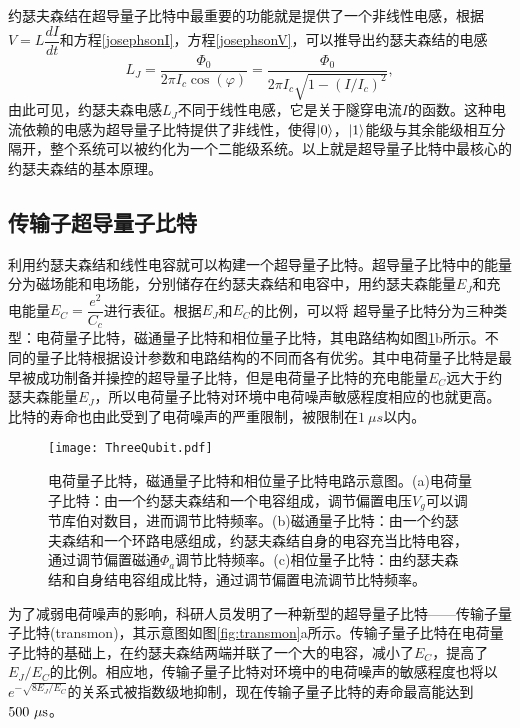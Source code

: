 约瑟夫森结在超导量子比特中最重要的功能就是提供了一个非线性电感，根据$ V=L\dfrac{{d}I}{{d}t}$和方程\ref{josephsonI}，方程\ref{josephsonV}，可以推导出约瑟夫森结的电感
\begin{equation}
	L_{J} = \dfrac{\Phi_{0}}{2\pi I_{c}\cos(\varphi)}=\dfrac{\Phi_{0}}{2\pi I_{c}\sqrt{1-(I/I_{c})^{2}}},
\end{equation}
由此可见，约瑟夫森电感$ L_{J}$不同于线性电感，它是关于隧穿电流$ I$的函数。这种电流依赖的电感为超导量子比特提供了非线性，使得$\left|0\right>$，$\left|1\right>$能级与其余能级相互分隔开，整个系统可以被约化为一个二能级系统。以上就是超导量子比特中最核心的约瑟夫森结的基本原理。

\subsection{传输子超导量子比特}
利用约瑟夫森结和线性电容就可以构建一个超导量子比特。超导量子比特中的能量分为磁场能和电场能，分别储存在约瑟夫森结和电容中，用约瑟夫森能量$ E_{J}$和充电能量$ E_{C} = \dfrac{{e}^{2}}{C_{c}}$进行表征。根据$ E_{J}$和$ E_{C}$的比例，可以将
超导量子比特分为三种类型：电荷量子比特，磁通量子比特和相位量子比特，其电路结构如图\ref{fig:ThreeQubit}b所示。不同的量子比特根据设计参数和电路结构的不同而各有优劣。其中电荷量子比特是最早被成功制备并操控的超导量子比特，但是电荷量子比特的充电能量$ E_{C}$远大于约瑟夫森能量$E_{J}$，所以电荷量子比特对环境中电荷噪声敏感程度相应的也就更高。比特的寿命也由此受到了电荷噪声的严重限制，被限制在$ 1 \ {\mu s}$以内\cite{vion2002manipulating,pashkin2003quantum}。
\begin{figure}[h]
	\centering
	\texttt{[image: ThreeQubit.pdf]}
	\caption{电荷量子比特，磁通量子比特和相位量子比特电路示意图。(a)电荷量子比特：由一个约瑟夫森结和一个电容组成，调节偏置电压$ V_{g}$可以调节库伯对数目，进而调节比特频率。(b)磁通量子比特：由一个约瑟夫森结和一个环路电感组成，约瑟夫森结自身的电容充当比特电容，通过调节偏置磁通$ \Phi_{a}$调节比特频率。(c)相位量子比特：由约瑟夫森结和自身结电容组成比特，通过调节偏置电流调节比特频率。}
	\label{fig:ThreeQubit}
\end{figure}

为了减弱电荷噪声的影响，科研人员发明了一种新型的超导量子比特——传输子量子比特(transmon)\cite{koch2007charge}，其示意图如图\ref{fig:transmon}a所示。传输子量子比特在电荷量子比特的基础上，在约瑟夫森结两端并联了一个大的电容，减小了$ E_{C}$，提高了$E_{J}/E_{C}$的比例。相应地，传输子量子比特对环境中的电荷噪声的敏感程度也将以$ {e}^{-\sqrt{8E_{J}/E_{C}}}$的关系式被指数级地抑制\cite{koch2007charge}，现在传输子量子比特的寿命最高能达到$\rm 500 \ \mu s$\cite{wang2021transmon}。

